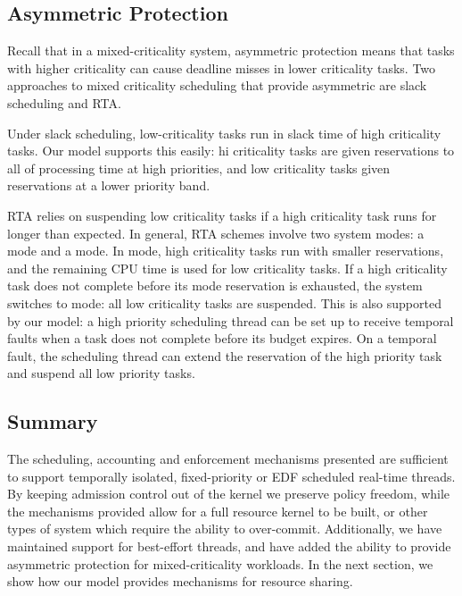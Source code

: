 \subsection{Asymmetric Protection}

Recall that in a mixed-criticality system, asymmetric protection means that tasks with higher
criticality can cause deadline misses in lower criticality tasks.  Two approaches to mixed
criticality scheduling that provide asymmetric are slack scheduling and
\gls{RTA}\citet{Burns_Davis_14}.

Under slack scheduling, low-criticality tasks run in slack time of high criticality tasks.  Our
model supports this easily: hi criticality tasks are given reservations to all of processing time at
high priorities, and low criticality tasks given reservations at a lower priority band.

\gls{RTA} relies on suspending low criticality tasks if a high criticality task runs for longer than
expected.  In general, \gls{RTA} schemes involve two system modes: a  mode and a 
mode.  In  mode, high criticality tasks run with smaller reservations, and the remaining
CPU time is used for low criticality tasks.  If a high criticality task does not complete before its
 mode reservation is exhausted, the system switches to  mode: all low criticality
tasks are suspended.  This is also supported by our model: a high priority scheduling thread can be
set up to receive temporal faults when a task does not complete before its budget expires.  On a
temporal fault, the scheduling thread can extend the reservation of the high priority task and
suspend all low priority tasks.

\subsection{Summary}

The scheduling, accounting and enforcement mechanisms presented are sufficient to support temporally
isolated, fixed-priority or \gls{EDF} scheduled real-time threads. By keeping admission control
out of the kernel we preserve policy freedom, while the mechanisms provided allow for a full
resource kernel to be built, or other types of system which require the ability to over-commit.
Additionally, we have maintained
support for best-effort threads, and have added the ability to provide asymmetric protection for
mixed-criticality workloads. 
In the next section, we show how our model provides mechanisms for resource sharing. 

